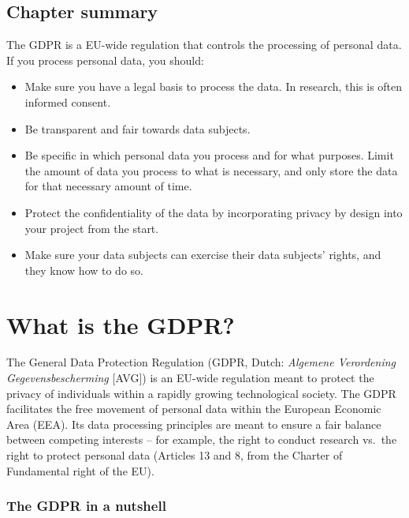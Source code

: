 \documentclass[
]{book}
\providecommand{\tightlist}{%
  \setlength{\itemsep}{0pt}\setlength{\parskip}{0pt}}
\begin{document}
\hypertarget{chapter-summary}{%
\subsection{Chapter summary}\label{chapter-summary}}

The GDPR is a EU-wide regulation that controls the processing of personal data.
If you process personal data, you should:

\begin{itemize}
\tightlist
\item
  Make sure you have a legal basis to process the
  data. In research, this is often informed consent.
\item
  Be transparent and fair towards data subjects.
\item
  Be specific in which personal data you process and for what purposes. Limit
  the amount of data you process to what is necessary, and only store the data
  for that necessary amount of time.
\item
  Protect the confidentiality of the data by incorporating
  privacy by design into your project from the start.
\item
  Make sure your data subjects can exercise their
  data subjects' rights, and they know how to
  do so.
\end{itemize}

\hypertarget{what-is-the-gdpr}{%
\section{What is the GDPR?}\label{what-is-the-gdpr}}

The General Data Protection Regulation (GDPR, Dutch: \emph{Algemene Verordening
Gegevensbescherming} {[}AVG{]}) is an EU-wide regulation meant to protect the privacy
of individuals within a rapidly growing technological society. The GDPR facilitates
the free movement of personal data within the European Economic Area (EEA). Its
data processing principles are meant to ensure a fair balance between competing
interests -- for example, the right to conduct research vs.~the right to protect
personal data (Articles 13 and 8, from the Charter of Fundamental right of the EU).

\hypertarget{the-gdpr-in-a-nutshell}{%
\subsubsection{The GDPR in a nutshell}\label{the-gdpr-in-a-nutshell}}
\end{document}
